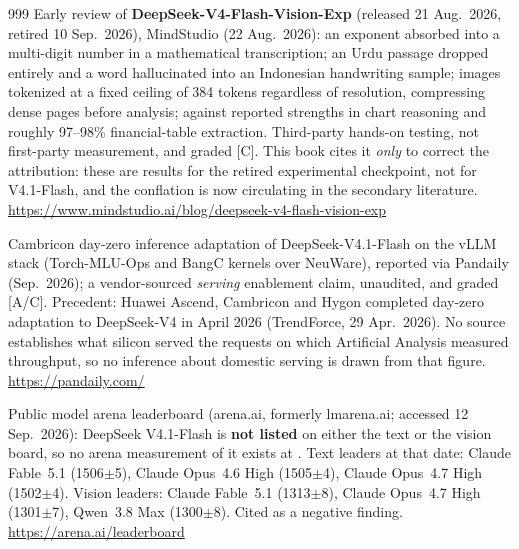 \begin{thebibliography}{999}
 Early review of \textbf{DeepSeek-V4-Flash-Vision-Exp} (released 21 Aug.\ 2026, retired 10 Sep.\ 2026), MindStudio (22 Aug.\ 2026): an exponent absorbed into a multi-digit number in a mathematical transcription; an Urdu passage dropped entirely and a word hallucinated into an Indonesian handwriting sample; images tokenized at a fixed ceiling of 384 tokens regardless of resolution, compressing dense pages before analysis; against reported strengths in chart reasoning and roughly 97--98\% financial-table extraction. Third-party hands-on testing, not first-party measurement, and graded [C]. This book cites it \emph{only} to correct the attribution: these are results for the retired experimental checkpoint, not for V4.1-Flash, and the conflation is now circulating in the secondary literature. \url{https://www.mindstudio.ai/blog/deepseek-v4-flash-vision-exp}

 Cambricon day-zero inference adaptation of DeepSeek-V4.1-Flash on the vLLM stack (Torch-MLU-Ops and BangC kernels over NeuWare), reported via Pandaily (Sep.\ 2026); a vendor-sourced \emph{serving} enablement claim, unaudited, and graded [A/C]. Precedent: Huawei Ascend, Cambricon and Hygon completed day-zero adaptation to DeepSeek-V4 in April 2026 (TrendForce, 29 Apr.\ 2026). No source establishes what silicon served the requests on which Artificial Analysis measured throughput, so no inference about domestic serving is drawn from that figure. \url{https://pandaily.com/}

 Public model arena leaderboard (arena.ai, formerly lmarena.ai; accessed 12 Sep.\ 2026): DeepSeek V4.1-Flash is \textbf{not listed} on either the text or the vision board, so no arena measurement of it exists at \datafreeze. Text leaders at that date: Claude Fable~5.1 (1506$\pm$5), Claude Opus~4.6 High (1505$\pm$4), Claude Opus~4.7 High (1502$\pm$4). Vision leaders: Claude Fable~5.1 (1313$\pm$8), Claude Opus~4.7 High (1301$\pm$7), Qwen~3.8 Max (1300$\pm$8). Cited as a negative finding. \url{https://arena.ai/leaderboard}




\end{thebibliography}
